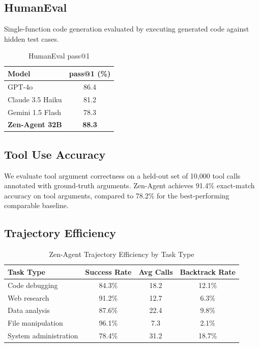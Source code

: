 \documentclass[11pt,a4paper]{article}
\begin{document}
\subsection{HumanEval}

Single-function code generation evaluated by executing generated code against hidden test cases.

\begin{table}[H]
\centering
\begin{tabular}{lc}
\toprule
\textbf{Model} & \textbf{pass@1 (\%)} \\
\midrule
GPT-4o & 86.4 \\
Claude 3.5 Haiku & 81.2 \\
Gemini 1.5 Flash & 78.3 \\
\textbf{Zen-Agent 32B} & \textbf{88.3} \\
\bottomrule
\end{tabular}
\caption{HumanEval pass@1}
\end{table}

\subsection{Tool Use Accuracy}

We evaluate tool argument correctness on a held-out set of 10,000 tool calls annotated with
ground-truth arguments. Zen-Agent achieves 91.4\% exact-match accuracy on tool arguments,
compared to 78.2\% for the best-performing comparable baseline.

\subsection{Trajectory Efficiency}

\begin{table}[H]
\centering
\begin{tabular}{lccc}
\toprule
\textbf{Task Type} & \textbf{Success Rate} & \textbf{Avg Calls} & \textbf{Backtrack Rate} \\
\midrule
Code debugging & 84.3\% & 18.2 & 12.1\% \\
Web research & 91.2\% & 12.7 & 6.3\% \\
Data analysis & 87.6\% & 22.4 & 9.8\% \\
File manipulation & 96.1\% & 7.3 & 2.1\% \\
System administration & 78.4\% & 31.2 & 18.7\% \\
\bottomrule
\end{tabular}
\caption{Zen-Agent Trajectory Efficiency by Task Type}
\end{table}
\end{document}
